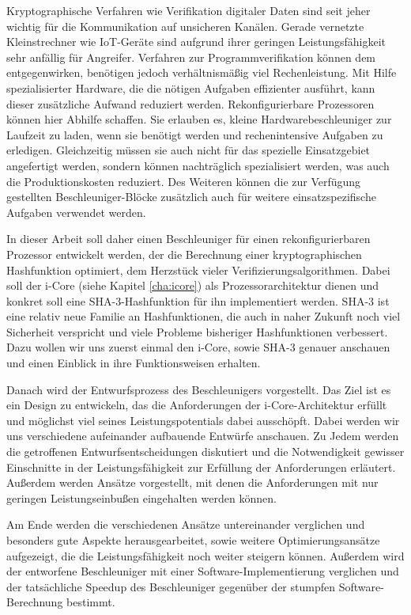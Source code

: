 Kryptographische Verfahren wie Verifikation digitaler Daten sind seit jeher wichtig für die Kommunikation auf unsicheren Kanälen.
Gerade vernetzte Kleinstrechner wie IoT-Geräte sind aufgrund ihrer geringen Leistungsfähigkeit sehr anfällig für Angreifer.
Verfahren zur Programmverifikation können dem entgegenwirken, benötigen jedoch verhältnismäßig viel Rechenleistung.
Mit Hilfe spezialisierter Hardware, die die nötigen Aufgaben effizienter ausführt, kann dieser zusätzliche Aufwand reduziert werden.
Rekonfigurierbare Prozessoren können hier Abhilfe schaffen. Sie erlauben es, kleine Hardwarebeschleuniger zur Laufzeit zu laden,
wenn sie benötigt werden und rechenintensive Aufgaben zu erledigen. Gleichzeitig müssen sie auch nicht für das spezielle
Einsatzgebiet angefertigt werden, sondern können nachträglich spezialisiert werden, was auch die Produktionskosten reduziert.
Des Weiteren können die zur Verfügung gestellten Beschleuniger-Blöcke zusätzlich auch für weitere einsatzspezifische Aufgaben verwendet werden.

In dieser Arbeit soll daher einen Beschleuniger für einen rekonfigurierbaren Prozessor entwickelt werden, der die Berechnung einer
kryptographischen Hashfunktion optimiert, dem Herzstück vieler Verifizierungsalgorithmen. Dabei soll der i-Core (siehe Kapitel \ref{cha:icore}) als Prozessorarchitektur
dienen und konkret soll eine SHA-3-Hashfunktion für ihn implementiert werden. SHA-3 ist eine relativ neue Familie an Hashfunktionen,
die auch in naher Zukunft noch viel Sicherheit verspricht und viele Probleme bisheriger Hashfunktionen verbessert.
Dazu wollen wir uns zuerst einmal den i-Core, sowie SHA-3 genauer anschauen und einen Einblick in ihre Funktionsweisen erhalten.

Danach wird der Entwurfsprozess des Beschleunigers vorgestellt. Das Ziel ist es ein Design zu entwickeln, das die Anforderungen
der i-Core-Architektur erfüllt und möglichst viel seines Leistungspotentials dabei ausschöpft. Dabei werden wir uns
verschiedene aufeinander aufbauende Entwürfe anschauen. Zu Jedem werden die getroffenen Entwurfsentscheidungen diskutiert und die
Notwendigkeit gewisser Einschnitte in der Leistungsfähigkeit zur Erfüllung der Anforderungen erläutert. Außerdem werden Ansätze
vorgestellt, mit denen die Anforderungen mit nur geringen Leistungseinbußen eingehalten werden können.

Am Ende werden die verschiedenen Ansätze untereinander verglichen und besonders gute Aspekte herausgearbeitet,
sowie weitere Optimierungsansätze aufgezeigt, die die Leistungsfähigkeit noch weiter steigern können. Außerdem wird der entworfene Beschleuniger
mit einer Software-Implementierung verglichen und der tatsächliche Speedup des Beschleuniger gegenüber der stumpfen Software-Berechnung bestimmt.